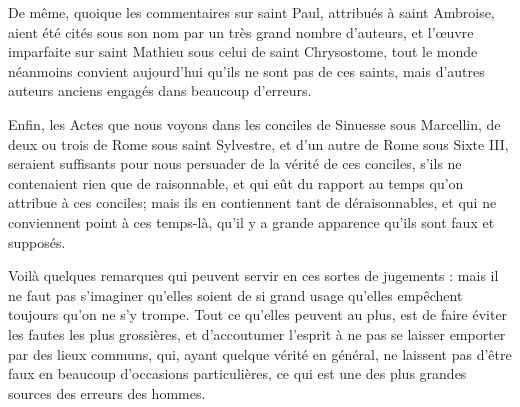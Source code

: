 De même, quoique les commentaires sur saint Paul, attribués à saint Ambroise, aient été cités sous son nom par un très grand nombre d'auteurs, et l'œuvre imparfaite sur saint Mathieu sous celui de saint Chrysostome, tout le monde néanmoins convient aujourd'hui qu'ils ne sont pas de ces saints, mais d'autres auteurs anciens engagés dans beaucoup d'erreurs.

Enfin, les Actes que nous voyons dans les conciles de Sinuesse sous Marcellin, de deux ou trois de Rome sous saint Sylvestre, et d'un autre de Rome sous Sixte III, seraient suffisants pour nous persuader de la vérité de ces conciles, s'ils ne contenaient rien que de raisonnable, et qui eût du rapport au temps qu'on attribue à ces conciles; mais ils en contiennent tant de déraisonnables, et qui ne conviennent point à ces temps-là, qu'il y a grande apparence qu'ils sont faux et supposés.

Voilà quelques remarques qui peuvent servir en ces sortes de jugements : mais il ne faut pas s'imaginer qu'elles soient de si grand usage qu'elles empêchent toujours qu'on ne s'y trompe. Tout ce qu'elles peuvent au plus, est de faire éviter les fautes les plus grossières, et d'accoutumer l'esprit à ne pas se laisser emporter par des lieux communs, qui, ayant quelque vérité en général, ne laissent pas d'être faux en beaucoup d'occasions particulières, ce qui est une des plus grandes sources des erreurs des hommes.

